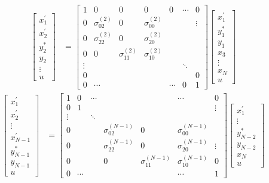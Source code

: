 \documentclass[a4paper,twoside,10pt,english]{report}
\begin{document}
\begin{align*}
\left[\begin{array}{c}
x_{1}^{\prime}\\
x_{2}^{\prime}\\
y_{2}^{*}\\
y_{2}\\
\vdots\\
u
\end{array}\right] & = \left[\begin{array}{ccccccc}
1 & 0 & 0 & 0 & 0 & \cdots & 0\\
0 & \sigma_{02}^{\left(2\right)} & 0 & \sigma_{00}^{\left(2\right)} &  &  & \vdots\\
0 & \sigma_{22}^{\left(2\right)} & 0 & \sigma_{20}^{\left(2\right)}\\
0 & 0 & \sigma_{11}^{\left(2\right)} & \sigma_{10}^{\left(2\right)}\\
\vdots &  &  &  &  & \ddots & \\
0 &  &  &  &  &  & 0\\
0 & \cdots &  &  & \cdots & 0 & 1
\end{array}\right]\left[\begin{array}{c}
x_{1}^{\prime}\\
y_{1}^{*}\\
y_{1}\\
x_{3}\\
\vdots\\
x_{N}\\
u
\end{array}\right]
\end{align*}
\begin{align*}
\left[\begin{array}{c}
x_{1}^{\prime}\\
x_{2}^{\prime}\\
\vdots\\
x_{N-1}^{\prime}\\
y_{N-1}^{*}\\
y_{N-1}\\
u
\end{array}\right] & = \left[\begin{array}{ccccccc}
1 & 0 & \cdots &  &  & \cdots & 0\\
0 & 1 &  &  &  &  & \vdots\\
\vdots &  & \ddots\\
0 &  &  & \sigma_{02}^{\left(N-1\right)} & 0 & \sigma_{00}^{\left(N-1\right)}\\
0 &  &  & \sigma_{22}^{\left(N-1\right)} & 0 & \sigma_{20}^{\left(N-1\right)} & \vdots\\
0 &  &  & 0 & \sigma_{11}^{\left(N-1\right)} & \sigma_{10}^{\left(N-1\right)} & 0\\
0 & \cdots &  &  &  & \cdots & 1
\end{array}\right]\left[\begin{array}{c}
x_{1}^{\prime}\\
\vdots\\
y_{N-2}^{*}\\
y_{N-2}\\
x_{N}\\
u
\end{array}\right]
\end{align*}
\end{document}
